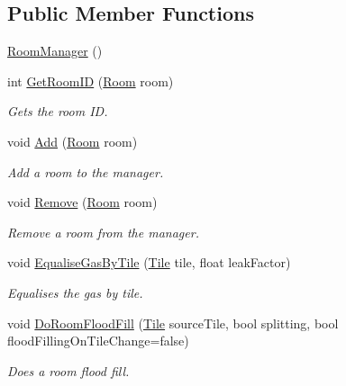 \subsection*{Public Member Functions}
\begin{DoxyCompactItemize}
\item 
\hyperlink{class_project_porcupine_1_1_rooms_1_1_room_manager_a8ce3c0a3d7904fe5c78439d87a1e49ff}{Room\+Manager} ()
\item 
int \hyperlink{class_project_porcupine_1_1_rooms_1_1_room_manager_a4d27ea1253a0af30d859d36334a63e6f}{Get\+Room\+ID} (\hyperlink{class_project_porcupine_1_1_rooms_1_1_room}{Room} room)
\begin{DoxyCompactList}\small\item\em Gets the room ID. \end{DoxyCompactList}\item 
void \hyperlink{class_project_porcupine_1_1_rooms_1_1_room_manager_a5af1864323a8a37644cc47a332297aaa}{Add} (\hyperlink{class_project_porcupine_1_1_rooms_1_1_room}{Room} room)
\begin{DoxyCompactList}\small\item\em Add a room to the manager. \end{DoxyCompactList}\item 
void \hyperlink{class_project_porcupine_1_1_rooms_1_1_room_manager_a80086ec355ff9c1489858d76358fba8b}{Remove} (\hyperlink{class_project_porcupine_1_1_rooms_1_1_room}{Room} room)
\begin{DoxyCompactList}\small\item\em Remove a room from the manager. \end{DoxyCompactList}\item 
void \hyperlink{class_project_porcupine_1_1_rooms_1_1_room_manager_a2d73aa65d42b9cedebe790024f6abf68}{Equalise\+Gas\+By\+Tile} (\hyperlink{class_tile}{Tile} tile, float leak\+Factor)
\begin{DoxyCompactList}\small\item\em Equalises the gas by tile. \end{DoxyCompactList}\item 
void \hyperlink{class_project_porcupine_1_1_rooms_1_1_room_manager_ac89dba8cf93ba78cc19e51d8ed948eae}{Do\+Room\+Flood\+Fill} (\hyperlink{class_tile}{Tile} source\+Tile, bool splitting, bool flood\+Filling\+On\+Tile\+Change=false)
\begin{DoxyCompactList}\small\item\em Does a room flood fill. \end{DoxyCompactList}\item 

\end{DoxyCompactItemize}
